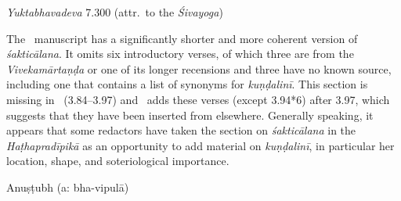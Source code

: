 \begin{ekdosis}
\begin{testimonia}[hp03_094_2]
\emph{Yuktabhavadeva} 7.300 (attr.~to the \emph{Śivayoga})
\begin{versinnote}
\end{versinnote}


\end{testimonia}

\begin{philcomm}[hp03_094_2]
The \alphaThree\ manuscript has a significantly shorter and more coherent version of \emph{śakticālana}. It omits six introductory verses, of which three are from the \emph{Vivekamārtaṇḍa} or one of its longer recensions and three have no known source, including one that contains a list of synonyms for \emph{kuṇḍalinī}. This section is missing in \alphaOne\ (3.84–3.97) and \alphaTwo\ adds these verses (except 3.94*6) after 3.97, which suggests that they have been inserted from elsewhere. Generally speaking, it appears that some redactors have taken the section on \emph{śakticālana} in the \emph{Haṭhapradīpikā} as an opportunity to add material on \emph{kuṇḍalinī}, in particular her location, shape, and soteriological importance. 

\end{philcomm}

\begin{metre}[hp03_094_2]
Anuṣṭubh (a: bha-vipulā)
\end{metre}


\end{ekdosis}
